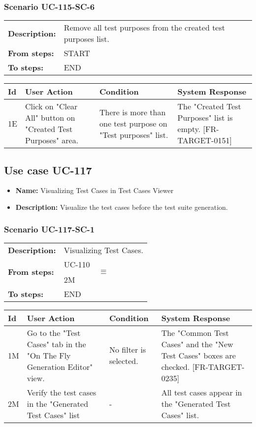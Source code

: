 \documentclass[a4paper,11pt]{article}
\newcommand{\bl}{\\ \hline}
\begin{document}
\subsubsection*{Scenario UC-115-SC-6}
\begin{tabular}{p{1in}p{4in}}
{\bf Description:} & Remove all test purposes from the created test purposes list. \\
{\bf From steps:} & START \\
{\bf To steps:} & END \\
\end{tabular}
 
\begin{tabular}{|p{0.8in}|p{1.6in}|p{1.6in}|p{1.6in}|}
\hline
Id & User Action & Condition & System Response  \bl 
1E & Click on "Clear All" button on "Created Test Purposes" area. & There is more than one test purpose on "Test purposes" list. & The "Created Test Purposes" list is empty. [FR-TARGET-0151] \bl 
\end{tabular}
\subsection*{Use case UC-117}
\begin{itemize}
\item {\bf Name: }Visualizing Test Cases in Test Cases Viewer
\item {\bf Description: }Visualize the test cases before the test suite generation.
\end{itemize}
\subsubsection*{Scenario UC-117-SC-1}
\begin{tabular}{p{1in}p{4in}}
{\bf Description:} & Visualizing Test Cases. \\
{\bf From steps:} & UC-110$$\equiv$$2M \\
{\bf To steps:} & END \\
\end{tabular}
 
\begin{tabular}{|p{0.8in}|p{1.6in}|p{1.6in}|p{1.6in}|}
\hline
Id & User Action & Condition & System Response  \bl 
1M & Go to the "Test Cases" tab in the "On The Fly Generation Editor" view. & No filter is selected. & The "Common Test Cases" and the "New Test Cases" boxes are checked. [FR-TARGET-0235] \bl 
2M & Verify the test cases in the "Generated Test Cases" list & - & All test cases appear in the "Generated Test Cases" list. \bl 
\end{tabular}
\end{document}
